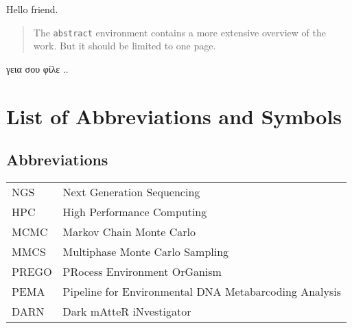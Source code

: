 \documentclass[master=elt,masteroption=eg]{kulemt}
\begin{document}
\begin{preface}
  
   Hello friend.
  
\end{preface}

\tableofcontents

\begin{abstract}
  The \texttt{abstract} environment contains a more extensive overview of
  the work. But it should be limited to one page.
\end{abstract}


\begin{abstract*}

   γεια σου φίλε ..
   
\end{abstract*}



\listoffiguresandtables


\chapter{List of Abbreviations and Symbols}

\section*{Abbreviations}
\begin{flushleft}
  \renewcommand{\arraystretch}{1.1}
  \begin{tabularx}{\textwidth}{@{}p{12mm}X@{}}
    NGS   & Next Generation Sequencing \\
    HPC   & High Performance Computing \\
    MCMC  & Markov Chain Monte Carlo \\
    MMCS  & Multiphase Monte Carlo Sampling \\
    PREGO & PRocess Environment OrGanism \\
    PEMA  & Pipeline for Environmental DNA Metabarcoding Analysis \\
    DARN  & Dark mAtteR iNvestigator \\
    
  \end{tabularx}
\end{flushleft}
\end{document}
